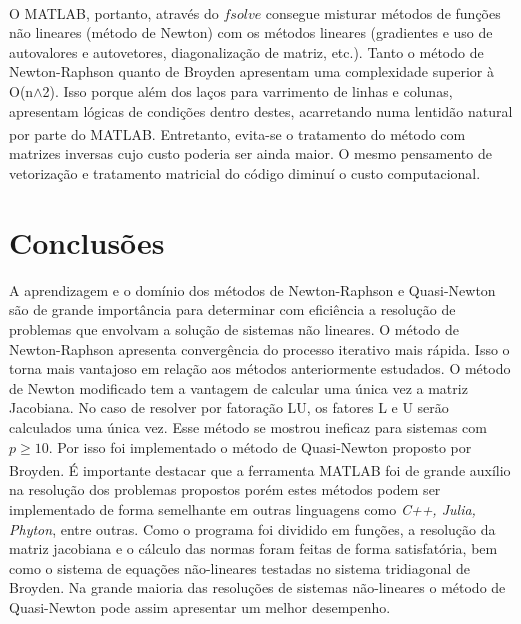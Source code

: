 \documentclass[
	12pt,				%
	oneside,			%
	a4paper,			%
	english,			%
	french,				%
	spanish,			%
	brazil				%
	]{abntex2}
\newcommand{\MATLAB}{MATLAB\textsuperscript{\textregistered}\xspace}
\begin{document}
O \MATLAB, portanto, através do $fsolve$ consegue misturar métodos de funções não lineares (método de Newton) com os métodos lineares (gradientes e uso de autovalores e autovetores, diagonalização de matriz, etc.). Tanto o método de Newton-Raphson quanto de Broyden apresentam uma complexidade superior à O(n$\mathrm{\wedge}$2). Isso porque além dos laços para varrimento de linhas e colunas, apresentam lógicas de condições dentro destes, acarretando numa lentidão natural por parte do \MATLAB. Entretanto, evita-se o tratamento do método com matrizes inversas cujo custo poderia ser ainda maior. O mesmo pensamento de vetorização e tratamento matricial do código diminuí o custo computacional.
\newpage
\chapter{Conclusões}

A aprendizagem e o domínio dos métodos de Newton-Raphson e Quasi-Newton são de grande importância para determinar com eficiência a resolução de problemas que envolvam a solução de sistemas não lineares. O método de Newton-Raphson apresenta convergência do processo iterativo mais rápida. Isso o torna mais vantajoso em relação aos métodos anteriormente estudados. O método de Newton modificado tem a vantagem de calcular uma única vez a matriz Jacobiana. No caso de resolver por fatoração LU, os fatores L e U serão calculados uma única vez. Esse método se mostrou ineficaz para sistemas com $p\geq10$. Por isso foi implementado o método de Quasi-Newton proposto por Broyden. É importante destacar que a ferramenta \MATLAB foi de grande auxílio na resolução dos problemas propostos porém estes métodos podem ser implementado de forma semelhante em outras linguagens como \textit{C++, Julia, Phyton}, entre outras. Como o programa foi dividido em funções, a resolução da matriz jacobiana e o cálculo das normas foram feitas de forma satisfatória, bem como o sistema de equações não-lineares testadas no sistema tridiagonal de Broyden. Na grande maioria das resoluções de sistemas não-lineares o método de Quasi-Newton pode assim apresentar um melhor desempenho.

\end{document}
